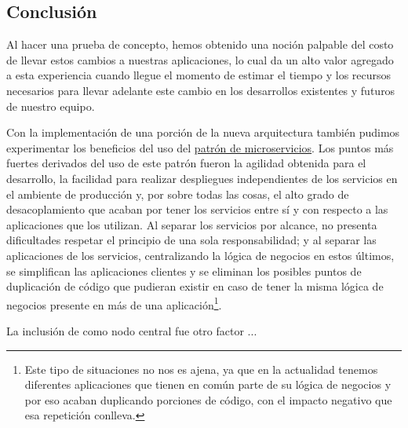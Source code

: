 \subsection{Conclusión}
\label{conclusion}

Al hacer una prueba de concepto, hemos obtenido una noción palpable del costo de llevar estos cambios a nuestras aplicaciones, lo cual da un alto valor agregado a esta experiencia cuando llegue el momento de estimar el tiempo y los recursos necesarios para llevar adelante este cambio en los desarrollos existentes y futuros de nuestro equipo.

Con la implementación de una porción de la nueva arquitectura también pudimos experimentar los beneficios del uso del \hyperref[microservicios]{patrón de microservicios}. \cite[p.~27]{richards2015}Los puntos más fuertes derivados del uso de este patrón fueron la agilidad obtenida para el desarrollo, la facilidad para realizar despliegues independientes de los servicios en el ambiente de producción y, por sobre todas las cosas, el alto grado de desacoplamiento que acaban por tener los servicios entre sí y con respecto a las aplicaciones que los utilizan. Al separar los servicios por alcance, no presenta dificultades respetar el principio de una sola responsabilidad; y al separar las aplicaciones de los servicios, centralizando la lógica de negocios en estos últimos, se simplifican las aplicaciones clientes y se eliminan los posibles puntos de duplicación de código que pudieran existir en caso de tener la misma lógica de negocios presente en más de una aplicación\footnote{Este tipo de situaciones no nos es ajena, ya que en la actualidad tenemos diferentes aplicaciones que tienen en común parte de su lógica de negocios y por eso acaban duplicando porciones de código, con el impacto negativo que esa repetición conlleva.}.

La inclusión de  como nodo central fue otro factor ...

